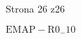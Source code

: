 \documentclass[a4paper,12pt]{article}
\begin{document}
Strona 26 z26

$\mathrm{E}\mathrm{M}\mathrm{A}\mathrm{P}-\mathrm{R}0_{-}10$
\end{document}
